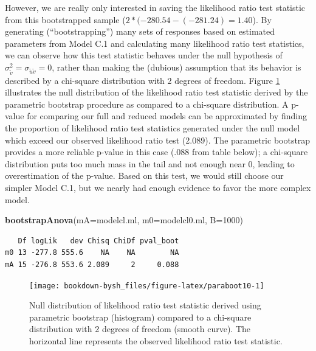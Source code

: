 \documentclass[
]{krantz}
\newenvironment{Shaded}{\begin{snugshade}}{\end{snugshade}}
\newcommand{\DataTypeTok}[1]{\textcolor[rgb]{0.27,0.27,0.27}{#1}}
\newcommand{\DecValTok}[1]{\textcolor[rgb]{0.06,0.06,0.06}{#1}}
\newcommand{\KeywordTok}[1]{\textcolor[rgb]{0.27,0.27,0.27}{\textbf{#1}}}
\newcommand{\NormalTok}[1]{#1}
\begin{document}
However, we are really only interested in saving the likelihood ratio test statistic from this bootstrapped sample (\(2*(-280.54 - (-281.24) = 1.40\)). By generating (``bootstrapping'') many sets of responses based on estimated parameters from Model C.1 and calculating many likelihood ratio test statistics, we can observe how this test statistic behaves under the null hypothesis of \(\sigma_{\tilde{v}}^{2} = \sigma_{\tilde{u}\tilde{v}} = 0\), rather than making the (dubious) assumption that its behavior is described by a chi-square distribution with 2 degrees of freedom. Figure \ref{fig:paraboot10} illustrates the null distribution of the likelihood ratio test statistic derived by the parametric bootstrap procedure as compared to a chi-square distribution. A p-value for comparing our full and reduced models can be approximated by finding the proportion of likelihood ratio test statistics generated under the null model which exceed our observed likelihood ratio test (2.089). The parametric bootstrap provides a more reliable p-value in this case (.088 from table below); a chi-square distribution puts too much mass in the tail and not enough near 0, leading to overestimation of the p-value. Based on this test, we would still choose our simpler Model C.1, but we nearly had enough evidence to favor the more complex model.

\begin{Shaded}
\begin{Highlighting}[]
\KeywordTok{bootstrapAnova}\NormalTok{(}\DataTypeTok{mA=}\NormalTok{modelcl.ml, }\DataTypeTok{m0=}\NormalTok{modelcl0.ml, }\DataTypeTok{B=}\DecValTok{1000}\NormalTok{)}
\end{Highlighting}
\end{Shaded}

\begin{verbatim}
   Df logLik   dev Chisq ChiDf pval_boot
m0 13 -277.8 555.6    NA    NA        NA
mA 15 -276.8 553.6 2.089     2     0.088
\end{verbatim}

\begin{figure}

{\centering \texttt{[image: bookdown-bysh\_files/figure-latex/paraboot10-1]} 

}

\caption{Null distribution of likelihood ratio test statistic derived using parametric bootstrap (histogram) compared to a chi-square distribution with 2 degrees of freedom (smooth curve).  The horizontal line represents the observed likelihood ratio test statistic.}\label{fig:paraboot10}
\end{figure}
\end{document}
